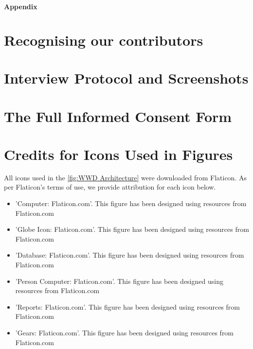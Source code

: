 
\begin{center}
	\textbf{\Large Appendix}
\end{center}
\protect\setcounter{tocdepth}{0}
\tableofcontents

{}

\section{Recognising our contributors}\label{asec:contributors}

\section{Interview Protocol and Screenshots}
\label{asec:protocol-screenshots}



\section{The Full Informed Consent Form}\label{asec:informed_consent}

\section{Credits for Icons Used in Figures} \label{asec:icon_attribution}
All icons used in the \ref{fig:WWD Architecture} were downloaded from Flaticon. As per Flaticon's terms of use, we provide attribution for each icon below.
\begin{itemize}
    \item 'Computer: Flaticon.com'. This figure has been designed using resources from Flaticon.com
    \item 'Globe Icon: Flaticon.com'. This figure has been designed using resources from Flaticon.com
    \item 'Database: Flaticon.com'. This figure has been designed using resources from Flaticon.com
    \item 'Person Computer: Flaticon.com'. This figure has been designed using resources from Flaticon.com
    \item 'Reports: Flaticon.com'. This figure has been designed using resources from Flaticon.com
    \item 'Gears: Flaticon.com'. This figure has been designed using resources from Flaticon.com
\end{itemize}

